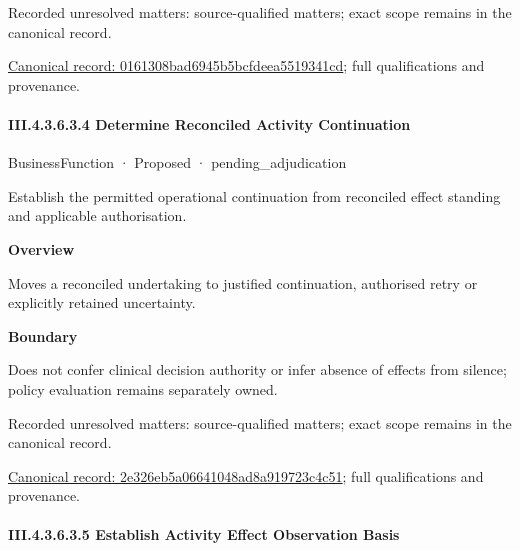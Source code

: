 {\small Recorded unresolved matters: source-qualified matters; exact scope remains in the canonical record.}\par
{\footnotesize \href{../../../../continuum/business/business-function/0161308bad6945b5bcfdeea5519341cd.md}{Canonical record: 0161308bad6945b5bcfdeea5519341cd}; full qualifications and provenance.}\par
\paragraph*{III.4.3.6.3.4 Determine Reconciled Activity Continuation}
\label{navigation:III.4.3.6.3.4}

\label{element:2e326eb5a06641048ad8a919723c4c51}
{\small BusinessFunction · Proposed · pending\_adjudication}\par

Establish the permitted operational continuation from reconciled effect standing and applicable authorisation.



\textbf{Overview}



Moves a reconciled undertaking to justified continuation, authorised retry or explicitly retained uncertainty.



\textbf{Boundary}



Does not confer clinical decision authority or infer absence of effects from silence; policy evaluation remains separately owned.


{\small Recorded unresolved matters: source-qualified matters; exact scope remains in the canonical record.}\par
{\footnotesize \href{../../../../continuum/business/business-function/2e326eb5a06641048ad8a919723c4c51.md}{Canonical record: 2e326eb5a06641048ad8a919723c4c51}; full qualifications and provenance.}\par
\paragraph*{III.4.3.6.3.5 Establish Activity Effect Observation Basis}
\label{navigation:III.4.3.6.3.5}

